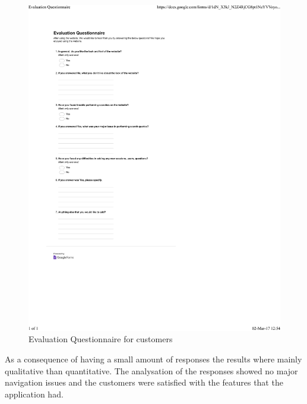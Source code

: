 \documentclass{l3proj}
\begin{document}
\begin{figure}
  \centerline{\includegraphics[width=\textwidth, height=\textheight, keepaspectratio]{evalQuestCustomers.pdf}}
  \caption{Evaluation Questionnaire for customers }
\end{figure}

As a consequence of having a small amount of responses the results where mainly qualitative than quantitative. The analysation of the responses showed no major navigation issues and the customers were satisfied with the features that the application had.
\end{document}
